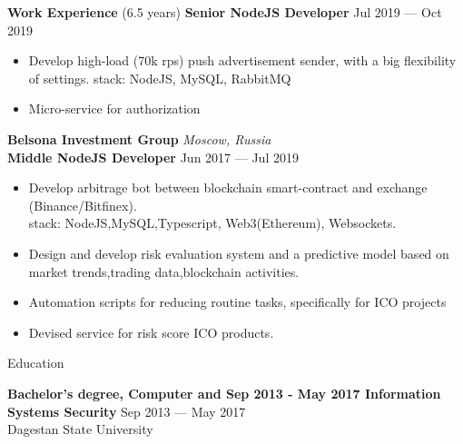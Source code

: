 \documentclass{resume} %
\begin{document}
\begin{rSection}{\textbf{Work Experience} (6.5 years) }
\textbf{Senior NodeJS Developer} \hfill Jul 2019 --- Oct 2019
\begin{itemize}
    \setlength\itemsep{-0.3em}
    \item Develop high-load (70k rps) push advertisement sender, with a big flexibility of settings. stack: NodeJS, MySQL, RabbitMQ
    \item Micro-service for authorization
\end{itemize}

\textbf{Belsona Investment Group} \hfill \textit{Moscow, Russia} \\
\textbf{Middle NodeJS Developer}  \hfill Jun 2017 --- Jul 2019
\begin{itemize}
    \setlength\itemsep{-0.3em}
    \item Develop arbitrage bot between blockchain smart-contract and exchange (Binance/Bitfinex).
    	 \\ stack: NodeJS,MySQL,Typescript, Web3(Ethereum), Websockets.
    \item Design and develop risk evaluation system and a predictive model based on market trends,trading data,blockchain activities.
    \item Automation scripts for reducing routine tasks, specifically for ICO projects
    \item Devised service for risk score ICO products.
\end{itemize}

\end{rSection}


\begin{rSection}{Education}

\textbf{Bachelor's degree, Computer and Sep 2013 - May 2017 Information Systems Security} \hfill {Sep 2013 --- May 2017} \\
	  Dagestan State University

\end{rSection}
\end{document}
